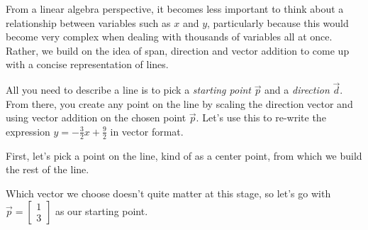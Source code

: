 \documentclass{ximera}
\begin{document}
\begin{exploration}
  \begin{center}
     \quad
     \quad
  \end{center}

  From a linear algebra perspective, it becomes less important to think about a relationship between variables such as $x$ and $y$, particularly because this would become very complex when dealing with thousands of variables all at once. Rather, we build on the idea of span, direction and vector addition to come up with a concise representation of lines. 
  
  All you need to describe a line is to pick a \emph{starting point} $\vec{p}$ and a \emph{direction} $\vec{d}$. From there, you create any point on the line by scaling the direction vector and using vector addition on the chosen point $\vec{p}$. Let's use this to re-write the expression $y=-\frac{3}{2}x+\frac{9}{2}$ in vector format.

  \begin{solution}
    First, let's pick a point on the line, kind of as a center point, from which we build the rest of the line. 

    Which vector we choose doesn't quite matter at this stage, so let's go with $\vec{p}=\begin{bmatrix}
      1\\3
    \end{bmatrix}$ as our starting point.


\end{solution}
\end{exploration}
\end{document}
